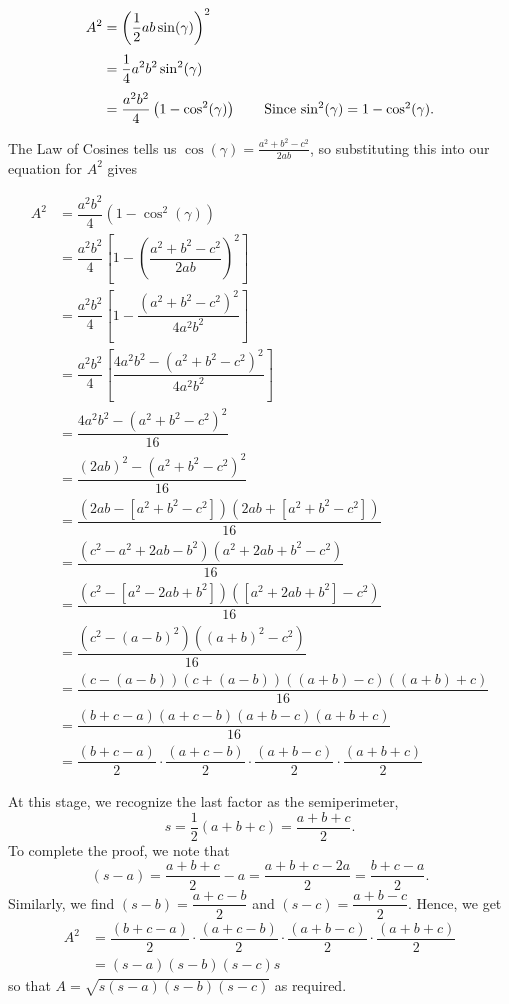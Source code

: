 \begin{align*}
A^2 & =  \left(\dfrac{1}{2} ab \sin(\gamma)\right)^2 \\[3pt] 
    & =  \dfrac{1}{4} a^2 b^2 \sin^{2}(\gamma) \\[3pt]
    & =  \dfrac{a^2b^2}{4} \left(1 - \cos^{2}(\gamma)\right) \tag*{Since $\sin^2(\gamma) = 1 - \cos^{2}(\gamma)$.}
\end{align*}

The Law of Cosines tells us $\cos(\gamma) = \frac{a^2 + b^2 - c^2}{2ab}$, so substituting this into our equation for $A^2$ gives

\begin{align*}
A^2 & =   \dfrac{a^2b^2}{4} \left(1 - \cos^{2}(\gamma)\right)\\[3pt]
    & =  \dfrac{a^2b^2}{4} \left[1 - \left( \dfrac{a^2 + b^2 - c^2}{2ab} \right)^2\right] \\[3pt]
    & =  \dfrac{a^2b^2}{4} \left[1 - \dfrac{\left(a^2 + b^2 - c^2\right)^2}{4a^2b^2} \right] \\[3pt]
	& =  \dfrac{a^2b^2}{4} \left[\dfrac{4a^2 b^2  - \left(a^2 + b^2 - c^2\right)^2}{4a^2b^2} \right]  \\[3pt]	 	
	& =  \dfrac{4a^2 b^2  - \left(a^2 + b^2 - c^2\right)^2}{16}\\[3pt] 	
	& =  \dfrac{(2ab)^2  - \left(a^2 + b^2 - c^2\right)^2}{16}\\[3pt] 	
	& =  \dfrac{\left( 2ab - \left[a^2+b^2 - c^2\right]\right)  \left( 2ab + \left[a^2+b^2 - c^2\right]\right)}{16}  \tag*{difference of squares.} \\[3pt]
	& =  \dfrac{\left(c^2 - a^2 + 2ab - b^2 \right)\left( a^2 + 2ab + b^2- c^2\right)}{16} \\[3pt] 
	& =  \dfrac{\left(c^2 - \left[a^2 - 2ab + b^2\right] \right)  \left( \left[a^2 + 2ab + b^2\right]- c^2\right)}{16}    \\[3pt] 
    & =  \dfrac{\left(c^2 - (a-b)^2 \right)  \left( (a+b)^2- c^2\right)}{16}    \tag*{perfect square trinomials.}\\[3pt] 
    & =  \dfrac{ (c-(a-b))(c+(a-b))((a+b) -c)((a+b)+c)}{16}    \tag*{difference of squares.} \\[3pt]
 	& =  \dfrac{ (b+c-a)(a+c-b)(a+b-c)(a+b+c)}{16}    \\[3pt]
    & =  \dfrac{(b+c-a)}{2} \cdot \dfrac{(a+c-b)}{2} \cdot \dfrac{(a+b-c)}{2} \cdot \dfrac{(a+b+c)}{2} 	 		
\end{align*}

At this stage, we recognize the last factor as the semiperimeter, 
\[
 s = \frac{1}{2}(a+b+c) = \dfrac{a+b+c}{2}.
\]  
To complete the proof, we note that
\[
 (s - a) = \dfrac{a+b+c}{2} - a = \dfrac{a+b+c-2a}{2} = \dfrac{b+c-a}{2} .
\]  			
Similarly, we find $(s-b) = \dfrac{a+c-b}{2}$ and $(s-c) = \dfrac{a+b-c}{2}$.  Hence, we get
\begin{align*}
A^2 & =  \dfrac{(b+c-a)}{2} \cdot \dfrac{(a+c-b)}{2} \cdot \dfrac{(a+b-c)}{2} \cdot \dfrac{(a+b+c)}{2}  \\[3pt]
 	& =  (s-a) (s-b) (s-c) s  
\end{align*}
so that  $A = \sqrt{s(s-a)(s-b)(s-c)}$ as required. 

